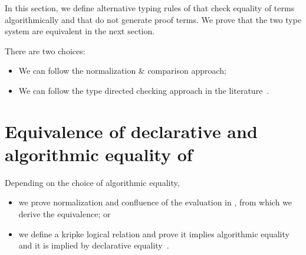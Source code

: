 \documentclass[10pt]{article}
\begin{document}
In this section, we define alternative typing rules of \STLCC that
check equality of terms algorithmically and that do not generate proof
terms. We prove that the two type system are equivalent in the next
section.

There are two choices:

\begin{itemize}
\item We can follow the normalization \& comparison approach;
\item We can follow the type directed checking approach in the
  literature~\cite{harper05,cave18}\cite[Chapter~6]{pierce04}.
\end{itemize}

\section{Equivalence of declarative and algorithmic equality of \STLCC}

Depending on the choice of algorithmic equality,
%
\begin{itemize}
\item we prove normalization and confluence of the evaluation in
  \STLCC, from which we derive the equivalence; or
\item we define a kripke logical relation and prove it implies
  algorithmic equality and it is implied by declarative
  equality~\cite{harper05,cave18}\cite[Chapter~6]{pierce04}.
\end{itemize}

 
\end{document}
